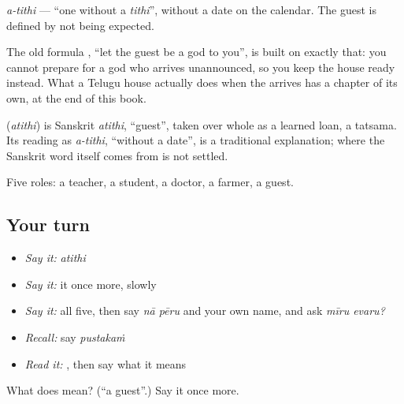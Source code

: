 \emph{a-tithi} — \textquotedblleft{}one without a \emph{tithi}\textquotedblright{}, without a date on the calendar. The guest is defined by not being expected.

The old formula   , \textquotedblleft{}let the guest be a god to you\textquotedblright{}, is built on exactly that: you cannot prepare for a god who arrives unannounced, so you keep the house ready instead. What a Telugu house actually does when the  arrives has a chapter of its own, at the end of this book.

\begin{cousinweb}
\textbf{} (\emph{atithi}) is Sanskrit \emph{atithi}, \textquotedblleft{}guest\textquotedblright{}, taken over whole as a learned loan, a tatsama. Its reading as \emph{a-tithi}, \textquotedblleft{}without a date\textquotedblright{}, is a traditional explanation; where the Sanskrit word itself comes from is not settled.
\end{cousinweb}

\begin{grammarlens}[title={What you've built}]
Five roles: a teacher, a student, a doctor, a farmer, a guest.
\end{grammarlens}

\subsection*{Your turn}
\begin{itemize}
\raggedright
  \item \emph{Say it:} \emph{atithi}
  \item \emph{Say it:} it once more, slowly
  \item \emph{Say it:} all five, then say \emph{nā pēru} and your own name, and ask \emph{mīru evaru?}
  \item \emph{Recall:} say \emph{pustakaṁ}
  \item \emph{Read it:} \textbf{}, then say what it means
\end{itemize}

\begin{tcolorbox}[breakable,colback=teal!4,colframe=teal!35!black,title={Before you move on}]
What does  mean? (\textquotedblleft{}a guest\textquotedblright{}.) Say it once more.
\end{tcolorbox}
